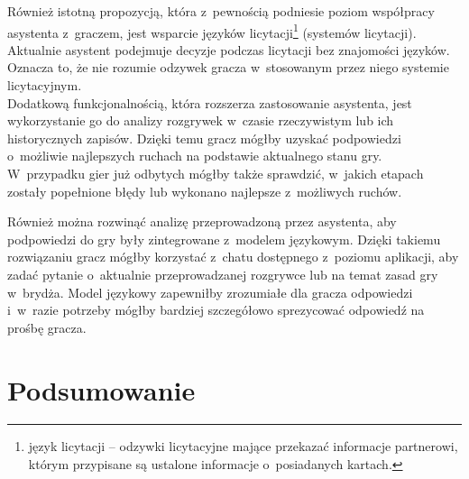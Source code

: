 Również istotną propozycją, która z~pewnością podniesie poziom
współpracy asystenta z~graczem, jest wsparcie języków licytacji\footnote{
    język licytacji -- odzywki licytacyjne mające przekazać informacje
    partnerowi, którym przypisane
    są ustalone informacje o~posiadanych kartach.
} (systemów licytacji).
Aktualnie asystent podejmuje decyzje podczas licytacji bez znajomości
języków. Oznacza to, że nie rozumie odzywek gracza w~stosowanym przez
niego systemie licytacyjnym. \\

Dodatkową funkcjonalnością, która rozszerza zastosowanie asystenta, jest
wykorzystanie go do analizy rozgrywek w~czasie rzeczywistym lub
ich historycznych zapisów. Dzięki temu gracz mógłby uzyskać podpowiedzi
o~możliwie najlepszych ruchach na podstawie aktualnego stanu gry.
W~przypadku gier już odbytych mógłby także sprawdzić, w~jakich etapach
zostały popełnione błędy lub wykonano najlepsze z~możliwych ruchów.

Również można rozwinąć analizę przeprowadzoną przez asystenta, aby
podpowiedzi do gry były zintegrowane z~modelem językowym. Dzięki
takiemu rozwiązaniu gracz mógłby korzystać z~chatu dostępnego
z~poziomu aplikacji, aby zadać pytanie o~aktualnie przeprowadzanej
rozgrywce lub na temat zasad gry w~brydża. Model językowy zapewniłby
zrozumiałe dla gracza odpowiedzi i~w~razie potrzeby mógłby bardziej
szczegółowo sprezycować odpowiedź na prośbę gracza.

\section{Podsumowanie}


